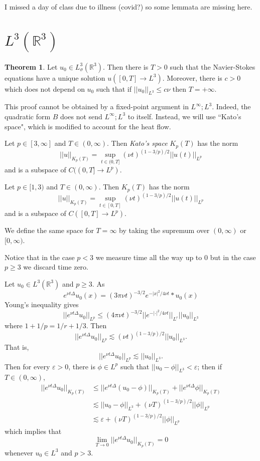 \documentclass[12pt]{book}
\newcommand{\RR}{\mathbb{R}}
\newcommand{\dfn}[1]{\emph{#1}\index{#1}}
\theoremstyle{definition}
\newtheorem{theorem}{Theorem}[chapter]
\newenvironment{definition}
  {\pushQED{\qed}\renewcommand{\qedsymbol}{$\diamondsuit$}\definitionx}
  {\popQED\endexamplex}
\begin{document}
I missed a day of class due to illness (covid?) so some lemmata are missing here.

\section{$L^3(\RR^3)$}
\begin{theorem}
Let $u_0 \in L^3_\sigma(\RR^3)$. Then there is $T > 0$ such that the Navier-Stokes equations have a unique solution $u([0, T] \to L^3)$.
Moreover, there is $c > 0$ which does not depend on $u_0$ such that if $||u_0||_{L^3} \leq c\nu$ then $T = +\infty$.
\end{theorem}
This proof cannot be obtained by a fixed-point argument in $L^\infty;L^3$.
Indeed, the quadratic form $B$ does not send $L^\infty;L^3$ to itself.
Instead, we will use ``Kato's space", which is modified to account for the heat flow.

\begin{definition}
Let $p \in [3, \infty]$ and $T \in (0, \infty)$. Then \dfn{Kato's space} $K_p(T)$ has the norm
$$||u||_{K_p(T)} = \sup_{t \in (0, T]} (\nu t)^{(1 - 3/p)/2}||u(t)||_{L^p}$$
and is a subspace of $C((0, T] \to L^p)$.

Let $p \in [1, 3)$ and $T \in (0, \infty)$. Then $K_p(T)$ has the norm
$$||u||_{K_p(T)} = \sup_{t \in [0, T]} (\nu t)^{(1 - 3/p)/2}||u(t)||_{L^p}$$
and is a subspace of $C([0, T] \to L^p)$.

We define the same space for $T = \infty$ by taking the supremum over $(0, \infty)$ or $[0, \infty)$.
\end{definition}

Notice that in the case $p < 3$ we measure time all the way up to $0$ but in the case $p \geq 3$ we discard time zero.

Let $u_0 \in L^3(\RR^3)$ and $p \geq 3$.
As
$$e^{\nu t \Delta} u_0(x) = (3\pi \nu t)^{-3/2} e^{-|x|^2/4\nu t} * u_0(x)$$
Young's inequality gives
$$||e^{\nu t \Delta} u_0||_{L^p} \leq (4 \pi \nu t)^{-3/2} ||e^{-|\cdot|^2/4\nu t}||_{L^r} ||u_0||_{L^3}$$
where $1 + 1/p = 1/r + 1/3$. Then
$$||e^{\nu t \Delta} u_0||_{L^p} \lesssim (\nu t)^{(1- 3/p)/2}||u_0||_{L^3}.$$
That is,
$$||e^{\nu t \Delta} u_0||_{L^p} \lesssim ||u_0||_{L^3}.$$
Then for every $\varepsilon > 0$, there is $\phi \in L^p$ such that $||u_0 - \phi||_{L^3} < \varepsilon$; then if $T \in (0, \infty)$,
\begin{align*}
||e^{\nu t \Delta} u_0||_{K_p(T)} &\leq ||e^{\nu t \Delta}(u_0 - \phi)||_{K_p(T)} + ||e^{\nu t \Delta} \phi||_{K_p(T)}\\
&\lesssim ||u_0 - \phi||_{L^3} + (\nu T)^{(1 - 3/p)/2} ||\phi||_{L^p}\\
&\lesssim \varepsilon + (\nu T)^{(1-3/p)/2} ||\phi||_{L^p}
\end{align*}
which implies that
$$\lim_{T \to 0} ||e^{\nu t \Delta} u_0||_{K_p(T)} = 0$$
whenever $u_0 \in L^3$ and $p > 3$.
\end{document}

